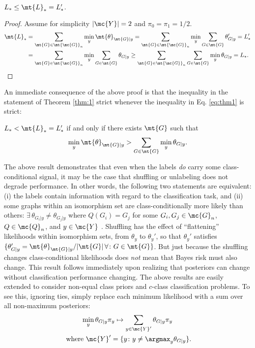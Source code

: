 \documentclass[10pt,journal,cspaper,compsoc]{IEEEtran}
\newcommand{\Qs}{Q}
\begin{document}
\begin{thm} \label{thm:1}
$L_* \leq \mt{L}_*=L_*'$.
\end{thm}

\begin{proof}
	Assume for simplicity $|\mc{Y}|=2$ and $\pi_0=\pi_1=1/2$.  
\begin{align} \label{eq:thm1}
	\mt{L}_*&=\sum_{\mt{G} \in \mt{\mc{G}}_n} \min_y  \mt{\theta}_{\mt{G}|y}  
	=\sum_{\mt{G} \in \mt{\mc{G}}_n} \min_y  \sum_{G \in \mt{G}}\theta_{G|y}'  = L_*' \nonumber \\
	&=\sum_{\mt{G} \in \mt{\mc{G}}_n} \min_y  \sum_{G \in \mt{G}}\theta_{G|y} 
	 \geq \sum_{\mt{G} \in \mt{\mc{G}}_n} \sum_{G \in \mt{G}} \min_y  \theta_{G|y}  = L_*.
\end{align}
\end{proof}



An immediate consequence of the above proof is that the inequality in the statement of Theorem \ref{thm:1} strict whenever the inequality in Eq. \eqref{eq:thm1} is strict:

\begin{thm} \label{thm:2}
	$L_* < \mt{L}_*=L'_*$ if and only if there exists $\mt{G}$ such that
	$$\min_y \mt{\theta}_{\mt{G}|y} > \sum_{G \in \mt{G}}\min_y \theta_{G|y}.$$
\end{thm}
The above result demonstrates that even when the labels \emph{do} carry some class-conditional signal, it may be the case that shuffling or unlabeling does not degrade performance.  In other words, the following two statements are equivalent: (i) the labels contain information with regard to the classification task, and (ii) some graphs within an isomorphism set are class-conditionally more likely than others: $\exists \, \theta_{G_i|y} \neq \theta_{G_j|y}$ where $\Qs(G_i)=G_j$ for some $G_i,G_j \in \mc{G}_n$, $\Qs \in \mc{Q}_n$, and $y \in \mc{Y}$%
.  Shuffling has the effect of ``flattening'' likelihoods within isomorphism sets, from $\theta_y$ to $\theta_y'$, so that $\theta_y'$ satisfies $\{\theta_{G|y}'=\mt{\theta}_{\mt{G}|y}/|\mt{G}| \, \forall \colon G \in \mt{G}\}$.  But just because the shuffling changes class-conditional likelihoods does \emph{not} mean that Bayes risk must also change. This result follows immediately upon realizing that posteriors can change without classification performance changing.  The above results are easily extended to consider non-equal class priors and $c$-class classification problems.  To see this, ignoring ties, simply replace each minimum likelihood with a sum over all non-maximum posteriors: 
\begin{multline}
\min_y \theta_{G|y} \pi_y \mapsto \sum_{y \in \mc{Y}'} \theta_{G|y} \pi_y \\ \text{ where } \mc{Y}' =\{y \colon y \neq \argmax_y \theta_{G|y}\}.
\end{multline}
\end{document}
